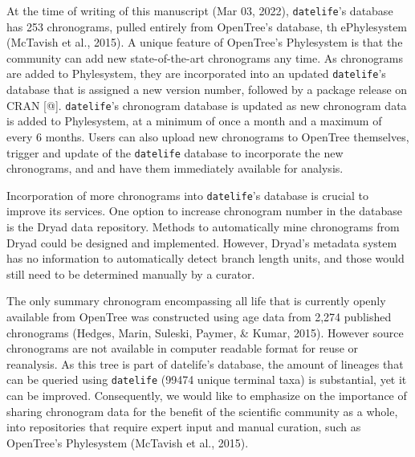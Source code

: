 \documentclass[
  english,
  man]{apa6}
\begin{document}
At the time of writing of this manuscript (Mar 03, 2022), \texttt{datelife}'s database has 253 chronograms, pulled entirely from OpenTree's database, th ePhylesystem (McTavish et al., 2015). A unique feature of OpenTree's Phylesystem is that the community can add new state-of-the-art chronograms any time. As chronograms are added to Phylesystem, they are incorporated into an updated \texttt{datelife}'s database that is assigned a new version number, followed by a package release on CRAN {[}@{]}. \texttt{datelife}'s chronogram database is updated as new chronogram data is added to Phylesystem, at a minimum of once a month and a maximum of every 6 months.
Users can also upload new chronograms to OpenTree themselves, trigger and update of the \texttt{datelife} database to incorporate the new chronograms, and and have them immediately available for analysis.

Incorporation of more chronograms into \texttt{datelife}'s database is crucial to improve its services. One option to increase chronogram number in the database is the Dryad data repository. Methods to automatically mine chronograms from Dryad could be designed and implemented. However, Dryad's metadata system has no information to automatically detect branch length units, and those would still need to be determined manually by a curator.

The only summary chronogram encompassing all life that is currently openly available from OpenTree
was constructed using age data from 2,274 published chronograms (Hedges, Marin, Suleski, Paymer, \& Kumar, 2015). However source chronograms are not available in computer readable format for reuse or reanalysis. As this tree is part of datelife's database, the amount of lineages that can be queried using \texttt{datelife} (99474 unique terminal taxa) is substantial, yet it can be improved.
Consequently, we would like to emphasize on the importance of sharing chronogram data for the benefit of the scientific community as a whole, into repositories that require expert input and manual curation, such as OpenTree's Phylesystem (McTavish et al., 2015).
\end{document}
